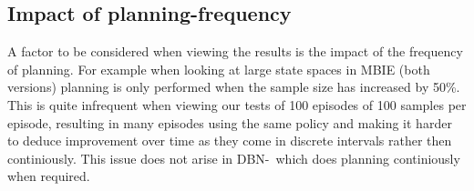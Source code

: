 \subsection{Impact of planning-frequency}
\label{sec:perform_planning_impact}
A factor to be considered when viewing the results is the impact of the frequency of planning. For example when looking at large state spaces in MBIE (both versions) planning is only performed when the sample size has increased by 50\%. This is quite infrequent when viewing our tests of 100 episodes of 100 samples per episode, resulting in many episodes using the same policy and making it harder to deduce improvement over time as they come in discrete intervals rather then continiously. This issue does not arise in DBN-\etre\ which does planning continiously when required.    